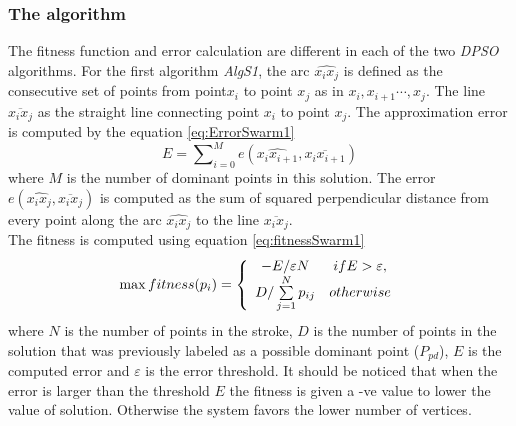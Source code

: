 \documentclass[a4paper,10pt]{IEEEconf}
\begin{document}
\subsubsection{The algorithm}
The fitness function and error calculation are different in each of the two \textit{DPSO} algorithms. For the first algorithm \textsl{AlgS1}, 
 the arc $\widehat{x_ix_j}$ is defined as the consecutive set of points from point$x_i$ to point $x_{j}$ as in $x_i,x_{i+1} \cdots,x_j$. The line $\overline{x_i x_j} $ as the straight line connecting point $x_i$ to point $x_j$. The approximation error is computed by the equation \ref{eq:ErrorSwarm1}
\begin{equation}
E=\sum\nolimits_{i = 0}^M e ( \widehat{x_ix_{i+1}},\overline{x_i x_{i+1}})
\label{eq:ErrorSwarm1}
\end{equation} where $M$ is the number of dominant points in this solution. The error $e ( \widehat{x_ix_j},\overline{x_i x_j})$ is computed as the sum of squared perpendicular distance from every point along the arc $\widehat{x_ix_j}$ to the line $\overline{x_i x_j}$.  \\
The fitness is computed using equation \ref{eq:fitnessSwarm1}\begin{equation}
\max fitness(p_i ) = \left\{ {\begin{array}{*{20}c}
   { - E/\varepsilon N} & {ifE > \varepsilon ,}  \\
   {D/\sum\limits_{j = 1}^N {p_{ij} } } & {otherwise}  \\
\end{array}} \right.
\label{eq:fitnessSwarm1}
\end{equation} where $N$ is the number of points in the stroke, $D$ is the number of points in the solution that was previously labeled as a possible dominant point ($P_{pd}$), $E$ is the computed error and $\varepsilon$ is the error threshold. It should be noticed that when the error is larger than the threshold $E$ the fitness is given a -ve value to lower the value of solution. Otherwise the system favors the lower number of vertices.\\ %
\end{document}
